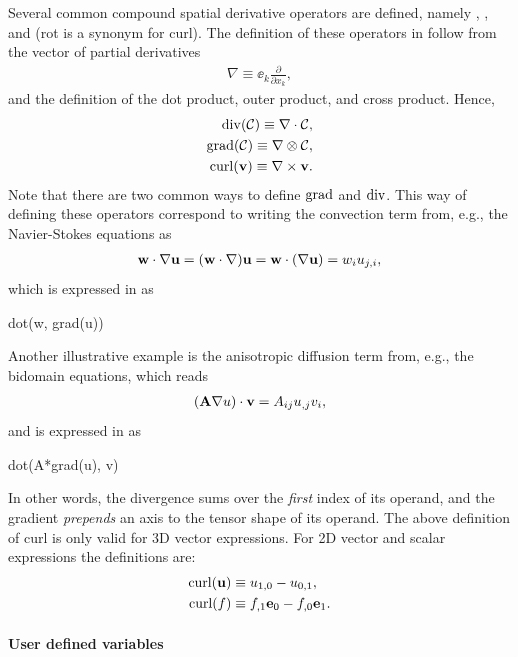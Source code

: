 Several common compound spatial derivative operators are defined,
namely , ,  and  (rot is
a synonym for curl).  The definition of these operators in \ufl{}
follow from the vector of partial derivatives
\begin{align}
\nabla \equiv \ee_k \frac{\partial}{\partial x_k},
\end{align}
and the definition of the dot product, outer product, and cross product. Hence,
\begin{align}
\operatorname{div}(\mathcal{C})  \equiv \nabla\cdot\mathcal{C}, \\
\operatorname{grad}(\mathcal{C}) \equiv \nabla\otimes\mathcal{C}, \\
\operatorname{curl}(\mathbf{v}) \equiv \nabla\times\mathbf{v}.
\end{align}
Note that there are two common ways to define $\operatorname{grad}$ and
$\operatorname{div}$.  This way of defining these operators correspond to
writing the convection term from, e.g., the Navier-Stokes equations as
\begin{align}
\mathbf{w}\cdot\nabla\mathbf{u} = (\mathbf{w}\cdot\nabla)\mathbf{u} = \mathbf{w}\cdot(\nabla\mathbf{u}) = w_i u_{j,i},
\end{align}
which is expressed in \ufl{} as
\begin{code}
dot(w, grad(u))
\end{code}
Another illustrative example is the anisotropic diffusion term from,
e.g., the bidomain equations, which reads
\begin{align}
(\mathbf{A}\nabla u)\cdot\mathbf{v} = A_{ij} u_{,j} v_i,
\end{align}
and is expressed in \ufl{} as
\begin{code}
dot(A*grad(u), v)
\end{code}
In other words, the divergence sums over the \emph{first} index of its
operand, and the gradient \emph{prepends} an axis to the tensor shape
of its operand.  The above definition of curl is only valid for 3D
vector expressions.  For 2D vector and scalar expressions the
definitions are:
\begin{align}
  \operatorname{curl}(\mathbf{u}) &\equiv u_{1,0} - u_{0,1}, \\
  \operatorname{curl}(f)   &\equiv f_{,1}\mathbf{e}_0 - f_{,0}\mathbf{e}_1.
\end{align}

\paragraph{User defined variables}
\label{ufl:sec:diff}

